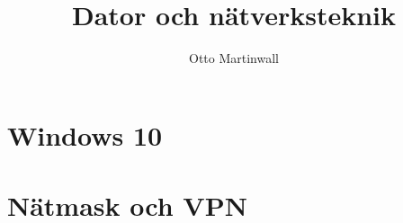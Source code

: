 

\title{Dator och nätverksteknik}
\author{Otto Martinwall}


\maketitle
\tableofcontents
\newpage
\newtheorem{definition}{Definition}
\newtheorem{theorem}{Theorem}

\section{Windows 10}


\section{Nätmask och VPN}


